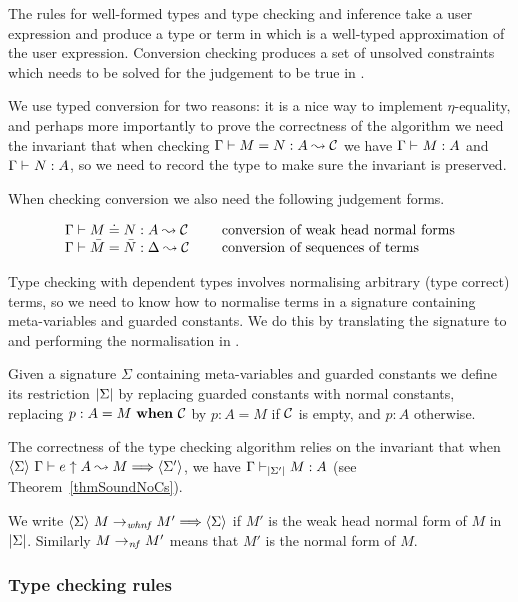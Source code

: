 The rules for well-formed types and type checking and inference take a user
expression and produce a type or term in {\Core} which is a
well-typed approximation of the user expression. Conversion checking produces
a set of unsolved constraints which needs to be solved for the judgement to be
true in {\Core}.

We use typed conversion for two reasons: it is a nice way to implement
$\eta$-equality, and perhaps more importantly to prove the correctness of the
algorithm we need the invariant that when checking ${\Gamma} \vdash {M} = {N} : {A} \leadsto {\mathcal{C}}$ we have
${\Gamma} \vdash_{} {M} : {A}$ and ${\Gamma} \vdash_{} {N} : {A}$, so we need to record the
type to make sure the invariant is preserved.

When checking conversion we also need the following judgement forms.

{\small
\[\begin{array}{lcl}
    {\Gamma} \vdash {M} \doteq {N} : {A} \leadsto {\mathcal{C}} &~& \mbox{conversion of weak head normal forms} \\
    {\Gamma} \vdash {\bar M} = {\bar N} : {\Delta} \leadsto {\mathcal{C}} &~& \mbox{conversion of sequences of terms} \\
\end{array}\]
}

Type checking with dependent types involves normalising arbitrary (type
correct) terms, so we need to know how to normalise terms in a signature
containing meta-variables and guarded constants. We do this by translating the
signature to {\Core} and performing the normalisation in {\Core}.

\begin{definition}
    Given a signature $\Sigma$ containing meta-variables and guarded constants
    we define its {\Core} restriction $\left|{\Sigma}\right|$ by replacing
    guarded constants with normal constants, replacing ${p} : {A} = {M} ~\mathbf{when}~ {\mathcal{C}}$
    by $p : A = M$ if $\mathcal{C}$ is empty, and $p : A$ otherwise.
\end{definition}

The correctness of the type checking algorithm relies on the invariant that
when $\langle {\Sigma} \rangle ~ {{\Gamma} \vdash {e} \uparrow {A} \leadsto {M}} \Longrightarrow \langle {\Sigma'} \rangle$, we have
${\Gamma} \vdash_{\left|{\Sigma'}\right|} {M} : {A}$ (see Theorem~\ref{thmSoundNoCs}).

We write $\langle {\Sigma} \rangle ~ {{M} \to_{\mathit{whnf}} {M'}} \Longrightarrow \langle {\Sigma} \rangle$ if $M'$ is the weak
head normal form of $M$ in $\left|{\Sigma}\right|$. Similarly ${M} \to_{\mathit{nf}} {M'}$
means that $M'$ is the normal form of $M$.

\subsubsection{Type checking rules}


